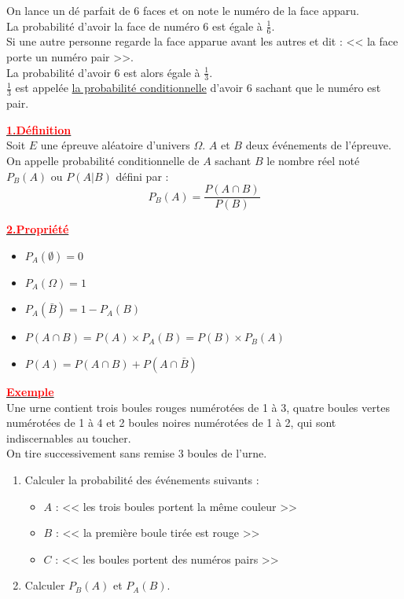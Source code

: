 \documentclass[12pt,a4paper]{article}
\begin{document}
On lance un dé parfait de 6 faces et on note le numéro de la face apparu. \\
La probabilité d'avoir la face de numéro 6 est égale à $\frac{1}{6}$. \\

Si une autre personne regarde la face apparue avant les autres et dit : << la face porte un numéro pair >>. \\
La probabilité d'avoir 6 est alors égale à $\frac{1}{3}$. \\
$\frac{1}{3}$ est appelée \underline{la probabilité conditionnelle} d'avoir 6 sachant que le numéro est pair.

\underline{\textbf{\textcolor{red}{1.Définition}}}\\

Soit $E$ une épreuve aléatoire d'univers $\Omega$. $A$ et $B$ deux événements de l'épreuve. On appelle probabilité conditionnelle de $A$ sachant $B$ le nombre réel noté $P_B(A)$ ou $P(A|B)$ défini par :
\begin{equation*}
    \boxed{P_B(A) = \frac{P(A \cap B)}{P(B)}}
\end{equation*}

\underline{\textbf{\textcolor{red}{2.Propriété}}}\\

\begin{itemize}
    \item $P_A(\emptyset) = 0$
    \item $P_A(\Omega) = 1$
    \item $P_A(\bar{B}) = 1 - P_A(B)$
    \item $P(A \cap B) = P(A) \times P_A(B) = P(B) \times P_B(A)$
    \item $\boxed{P(A) = P(A \cap B) + P(A \cap \bar{B})}$
\end{itemize}

\underline{\textbf{\textcolor{red}{Exemple}}}\\

Une urne contient trois boules rouges numérotées de 1 à 3, quatre boules vertes numérotées de 1 à 4 et 2 boules noires numérotées de 1 à 2, qui sont indiscernables au toucher. \\
On tire successivement sans remise 3 boules de l'urne.

\begin{enumerate}
    \item Calculer la probabilité des événements suivants :
    \begin{itemize}
        \item $A$ : << les trois boules portent la même couleur >>
        \item $B$ : << la première boule tirée est rouge >>
        \item $C$ : << les boules portent des numéros pairs >>
    \end{itemize}
    \item Calculer $P_B(A)$ et $P_A(B)$.
\end{enumerate}
\end{document}
